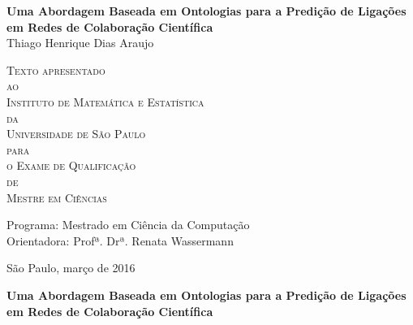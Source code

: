\documentclass[11pt,twoside,a4paper]{book}
\begin{document}
\frontmatter
\fancyhead[RO]{{\footnotesize\rightmark}\hspace{2em}\thepage}
\setcounter{tocdepth}{2}
\fancyhead[LE]{\thepage\hspace{2em}\footnotesize{\leftmark}}
\fancyhead[RE,LO]{}
\fancyhead[RO]{{\footnotesize\rightmark}\hspace{2em}\thepage}

\onehalfspacing{}  %


\newcommand{\mydocumenttitle}{Uma Abordagem Baseada em Ontologias para a Predição de Ligações em Redes de Colaboração Científica}


\thispagestyle{empty}
\begin{center}
    \vspace*{2.3cm}
    \textbf{\Large{\mydocumenttitle{}}}\\

    \vspace*{1.2cm}
    \Large{Thiago Henrique Dias Araujo}

    \vskip 2cm
    \textsc{
    Texto apresentado\\[-0.25cm]
    ao\\[-0.25cm]
    Instituto de Matemática e Estatística\\[-0.25cm]
    da\\[-0.25cm]
    Universidade de São Paulo\\[-0.25cm]
    para\\[-0.25cm]
    o Exame de Qualificação\\[-0.25cm]
    de\\[-0.25cm]
    Mestre em Ciências}

    \vskip 1.5cm
    Programa: Mestrado em Ciência da Computação\\
    Orientadora: Profª. Drª. Renata Wassermann

   	\vskip 1cm

    \vskip 0.5cm
    \normalsize{São Paulo, março de 2016}
\end{center}

%
%
%
\newpage
\thispagestyle{empty}
    \begin{center}
        \vspace*{2.3 cm}
        \textbf{\Large{\mydocumenttitle{}}}\\
        \vspace*{2 cm}
    \end{center}
\end{document}
